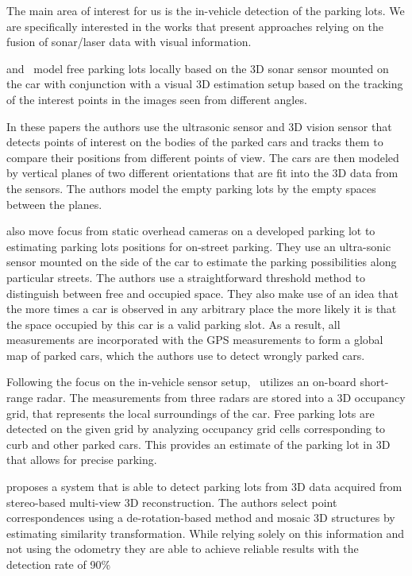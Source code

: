 The main area of interest for us is the in-vehicle detection of the parking
lots. We are specifically interested in the works that present approaches
relying on the fusion of sonar/laser data with visual information.

\citet{fintyelvestri} and~\citet{abadvestri} model free parking lots locally
based on the 3D sonar sensor mounted on the car with conjunction with a visual
3D estimation setup based on the tracking of the interest points in the images
seen from different angles.

In these papers the authors use the ultrasonic sensor and 3D vision sensor
that detects points of interest on the bodies of the parked cars and tracks
them to compare their positions from different points of view. The cars are
then modeled by vertical planes of two different orientations that are fit
into the 3D data from the sensors. The authors model the empty parking lots by
the empty spaces between the planes.

\citet{vladimircoric} also move focus from static overhead cameras on a
developed parking lot to estimating parking lots positions for on-street
parking. They use an ultra-sonic sensor mounted on the side of the car to
estimate the parking possibilities along particular streets. The authors use a
straightforward threshold method to distinguish between free and occupied
space. They also make use of an idea that the more times a car is observed in
any arbitrary place the more likely it is that the space occupied by this car
is a valid parking slot. As a result, all measurements are incorporated with
the GPS measurements to form a global map of parked cars, which the authors
use to detect wrongly parked cars.

Following the focus on the in-vehicle sensor setup,~\citet{schmid11} utilizes
an on-board short-range radar. The measurements from three radars are stored
into a 3D occupancy grid, that represents the local surroundings of the car.
Free parking lots are detected on the given grid by analyzing occupancy grid
cells corresponding to curb and other parked cars. This provides an estimate
of the parking lot in 3D that allows for precise parking.

\citet{suhr10} proposes a system that is able to detect parking lots from 3D
data acquired from stereo-based multi-view 3D reconstruction. The authors
select point correspondences using a de-rotation-based method and mosaic 3D
structures by estimating similarity transformation. While relying solely on
this information and not using the odometry they are able to achieve reliable
results with the detection rate of 90\%

